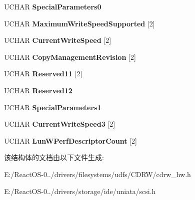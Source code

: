 \begin{DoxyCompactItemize}
U\+C\+H\+AR {\bfseries Special\+Parameters0}
\item 
\mbox{\label{struct___m_o_d_e___c_a_p_a_b_i_l_i_t_i_e_s___p_a_g_e2_a6e74b9434ddaf55f4e6a6a77c0f2c9a5}} 
U\+C\+H\+AR {\bfseries Maximum\+Write\+Speed\+Supported} \mbox{[}2\mbox{]}
\item 
\mbox{\label{struct___m_o_d_e___c_a_p_a_b_i_l_i_t_i_e_s___p_a_g_e2_acadf18f3a5a44cad88365cfb93517ce9}} 
U\+C\+H\+AR {\bfseries Current\+Write\+Speed} \mbox{[}2\mbox{]}
\item 
\mbox{\label{struct___m_o_d_e___c_a_p_a_b_i_l_i_t_i_e_s___p_a_g_e2_a32e4bc85c4983597d3bc1579ce6e9c20}} 
U\+C\+H\+AR {\bfseries Copy\+Management\+Revision} \mbox{[}2\mbox{]}
\item 
\mbox{\label{struct___m_o_d_e___c_a_p_a_b_i_l_i_t_i_e_s___p_a_g_e2_a73551227f0829ff0f6f67ccece3ec1d2}} 
U\+C\+H\+AR {\bfseries Reserved11} \mbox{[}2\mbox{]}
\item 
\mbox{\label{struct___m_o_d_e___c_a_p_a_b_i_l_i_t_i_e_s___p_a_g_e2_a0d9ed03eb7b9f0fa70aa9aae4afe76d5}} 
U\+C\+H\+AR {\bfseries Reserved12}
\item 
\mbox{\label{struct___m_o_d_e___c_a_p_a_b_i_l_i_t_i_e_s___p_a_g_e2_a472765bcd68074ef5e64843704fec952}} 
U\+C\+H\+AR {\bfseries Special\+Parameters1}
\item 
\mbox{\label{struct___m_o_d_e___c_a_p_a_b_i_l_i_t_i_e_s___p_a_g_e2_aa45cd74bc759eeb47541b482ec45a501}} 
U\+C\+H\+AR {\bfseries Current\+Write\+Speed3} \mbox{[}2\mbox{]}
\item 
\mbox{\label{struct___m_o_d_e___c_a_p_a_b_i_l_i_t_i_e_s___p_a_g_e2_a46c555c97b32360fac14dc44b46c0a37}} 
U\+C\+H\+AR {\bfseries Lun\+W\+Perf\+Descriptor\+Count} \mbox{[}2\mbox{]}
\end{DoxyCompactItemize}


该结构体的文档由以下文件生成\+:\begin{DoxyCompactItemize}
\item 
E\+:/\+React\+O\+S-\/0../drivers/filesystems/udfs/\+C\+D\+R\+W/cdrw\+\_\+hw.\+h\item 
E\+:/\+React\+O\+S-\/0../drivers/storage/ide/uniata/scsi.\+h\end{DoxyCompactItemize}
